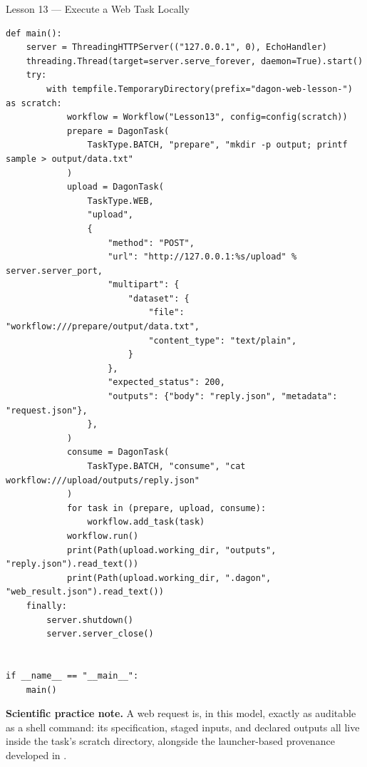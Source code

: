 \begin{lessonbox}{Lesson 13 --- Execute a Web Task Locally}
\begin{lstlisting}
def main():
    server = ThreadingHTTPServer(("127.0.0.1", 0), EchoHandler)
    threading.Thread(target=server.serve_forever, daemon=True).start()
    try:
        with tempfile.TemporaryDirectory(prefix="dagon-web-lesson-") as scratch:
            workflow = Workflow("Lesson13", config=config(scratch))
            prepare = DagonTask(
                TaskType.BATCH, "prepare", "mkdir -p output; printf sample > output/data.txt"
            )
            upload = DagonTask(
                TaskType.WEB,
                "upload",
                {
                    "method": "POST",
                    "url": "http://127.0.0.1:%s/upload" % server.server_port,
                    "multipart": {
                        "dataset": {
                            "file": "workflow:///prepare/output/data.txt",
                            "content_type": "text/plain",
                        }
                    },
                    "expected_status": 200,
                    "outputs": {"body": "reply.json", "metadata": "request.json"},
                },
            )
            consume = DagonTask(
                TaskType.BATCH, "consume", "cat workflow:///upload/outputs/reply.json"
            )
            for task in (prepare, upload, consume):
                workflow.add_task(task)
            workflow.run()
            print(Path(upload.working_dir, "outputs", "reply.json").read_text())
            print(Path(upload.working_dir, ".dagon", "web_result.json").read_text())
    finally:
        server.shutdown()
        server.server_close()


if __name__ == "__main__":
    main()
\end{lstlisting}

\textbf{Scientific practice note.} A web request is, in this model, exactly
as auditable as a shell command: its specification, staged inputs, and
declared outputs all live inside the task's scratch directory, alongside the
launcher-based provenance developed in .
\end{lessonbox}

